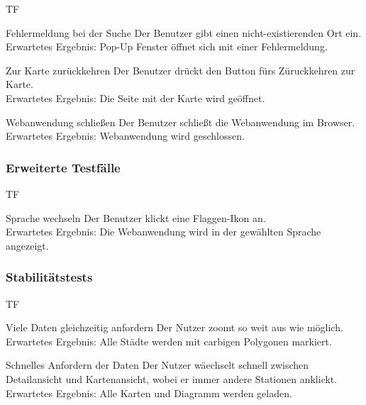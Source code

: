 \begin{Kriterien}{TF}
	\item[Fehlermeldung bei der Suche] Der Benutzer gibt einen nicht-existierenden Ort ein. \\ Erwartetes Ergebnis: Pop-Up Fenster öffnet sich mit einer Fehlermeldung.
	
	\item[Zur Karte zurückkehren] Der Benutzer drückt den Button fürs Züruckkehren zur Karte. \\ Erwartetes Ergebnis: Die Seite mit der Karte wird geöffnet. 
	
	\item[Webanwendung schließen] Der Benutzer schließt die Webanwendung im Browser. \\ Erwartetes Ergebnis: Webanwendung wird geschlossen.
\end{Kriterien}
\subsubsection{Erweiterte Testfälle}
\begin{Kriterien}{TF}
	
	\item[Sprache wechseln] Der Benutzer klickt eine Flaggen-Ikon an. \\ Erwartetes Ergebnis: Die Webanwendung wird in der gewählten Sprache angezeigt.
	
\end{Kriterien}
\subsubsection{Stabilitätstests}
\begin{Kriterien}{TF}

	\item[Viele Daten gleichzeitig anfordern] Der Nutzer zoomt so weit aus wie möglich.\\ Erwartetes Ergebnis: Alle Städte werden mit carbigen Polygonen markiert.

	\item[Schnelles Anfordern der Daten] Der Nutzer wäechselt schnell zwischen Detailansicht und Kartenansicht, wobei er immer andere \gls{Stationen} anklickt. \\ Erwartetes Ergebnis: Alle Karten und Diagramm werden geladen.
	
	
\end{Kriterien}
